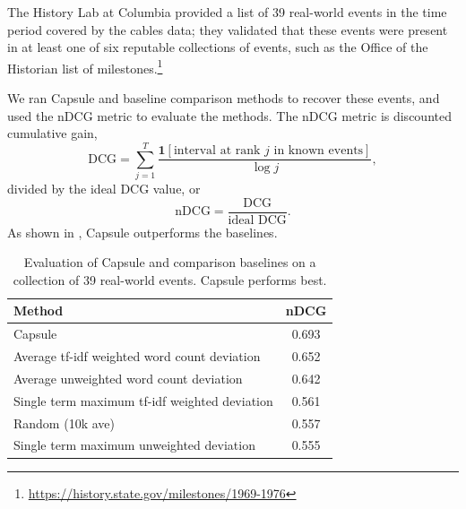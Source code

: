 The History Lab at Columbia provided a list of 39 real-world events in the time period covered by the cables data; they validated that these events were present in at least one of six reputable collections of events, such as the Office of the Historian list of milestones.\footnote{\url{https://history.state.gov/milestones/1969-1976}}

We ran Capsule and baseline comparison methods to recover these events, and used the nDCG metric to evaluate the methods.  The nDCG metric is discounted cumulative gain,
\begin{equation}
\mbox{DCG} = \sum_{j=1}^T \frac{\mathbf{1}[\mbox{interval at rank $j$ in known events}]}{\log j},
\end{equation}
divided by the ideal DCG value, or 
\begin{equation}
\mbox{nDCG} = \frac{\mbox{DCG}}{\mbox{ideal DCG}}.
\end{equation}
As shown in , Capsule outperforms the baselines.
\begin{table}[bt]
\centering
\begin{tabular}{l c}
\toprule
\textbf{Method} & \textbf{nDCG} \\
\midrule
Capsule & 0.693 \\
Average tf-idf weighted word count deviation & 0.652 \\
Average unweighted word count deviation & 0.642 \\
Single term maximum tf-idf weighted deviation & 0.561 \\
Random (10k ave) & 0.557 \\
Single term maximum unweighted deviation & 0.555 \\
\bottomrule
\end{tabular}
\caption{Evaluation of Capsule and comparison baselines on a collection of 39 real-world events.  Capsule performs best.}
\label{table:cables:ndcg}
\end{table}

